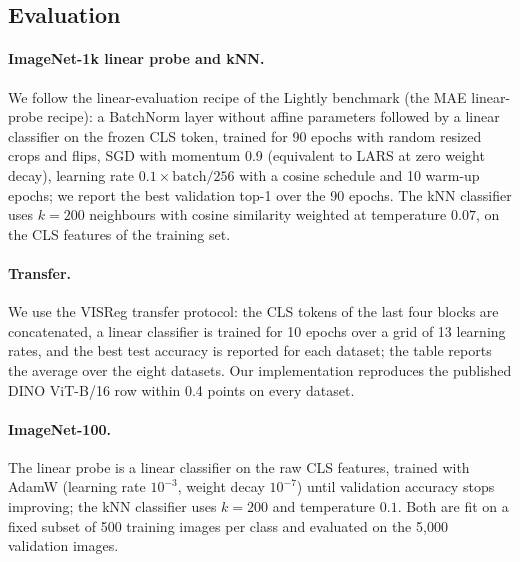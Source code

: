 \documentclass{article} %
\theoremstyle{remark}
\begin{document}
\subsection{Evaluation}
\paragraph{ImageNet-1k linear probe and kNN.}
We follow the linear-evaluation recipe of the Lightly benchmark (the MAE linear-probe recipe): a BatchNorm layer without affine parameters followed by a linear classifier on the frozen CLS token, trained for 90 epochs with random resized crops and flips, SGD with momentum 0.9 (equivalent to LARS at zero weight decay), learning rate $0.1\times\mathrm{batch}/256$ with a cosine schedule and 10 warm-up epochs; we report the best validation top-1 over the 90 epochs. The kNN classifier uses $k=200$ neighbours with cosine similarity weighted at temperature $0.07$, on the CLS features of the training set.

\paragraph{Transfer.}
We use the VISReg transfer protocol: the CLS tokens of the last four blocks are concatenated, a linear classifier is trained for 10 epochs over a grid of 13 learning rates, and the best test accuracy is reported for each dataset; the table reports the average over the eight datasets. Our implementation reproduces the published DINO ViT-B/16 row within 0.4 points on every dataset.

\paragraph{ImageNet-100.}
The linear probe is a linear classifier on the raw CLS features, trained with AdamW (learning rate $10^{-3}$, weight decay $10^{-7}$) until validation accuracy stops improving; the kNN classifier uses $k=200$ and temperature $0.1$. Both are fit on a fixed subset of 500 training images per class and evaluated on the 5{,}000 validation images.
\end{document}

